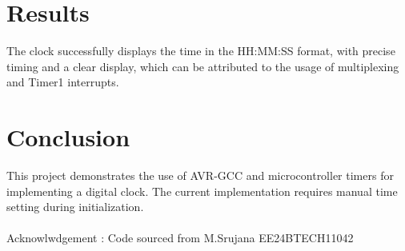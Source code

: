 \documentclass{article}
\begin{document}
\section{Results}
The clock successfully displays the time in the HH:MM:SS format, with precise timing and a clear display, which can be attributed to the usage of multiplexing and Timer1 interrupts.

\section{Conclusion}
This project demonstrates the use of AVR-GCC and microcontroller timers for implementing a digital clock. The current implementation requires manual time setting during initialization.\\\\
Acknowlwdgement : Code sourced from M.Srujana EE24BTECH11042
\end{document}
